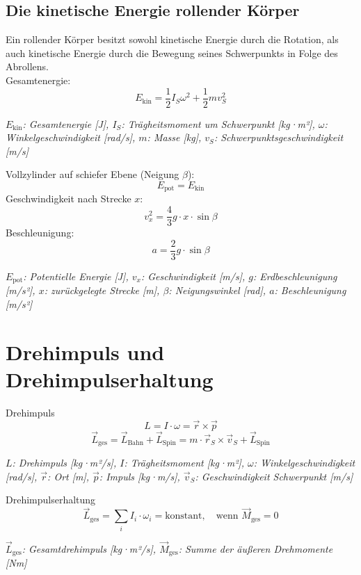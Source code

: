\documentclass[a4paper,10pt]{article}
\newenvironment{displayformula}
{
	\begin{framed}
		\color{formulaColor}
	}
	{\end{framed}}
\newcommand{\formulalegend}[1]{%
	\par\vspace{0.5ex}%
	{{\color{legendColor}\RaggedRight\small\textit{#1}}}%
	\par\vspace{1.5ex}%
}
\begin{document}
\subsection{Die kinetische Energie rollender Körper}

\begin{displayformula}
	Ein rollender Körper besitzt sowohl kinetische Energie durch die Rotation, als auch kinetische Energie durch die Bewegung seines Schwerpunkts in Folge des Abrollens. \\ 
	Gesamtenergie:
	\[
	E_{\text{kin}} = \frac{1}{2} I_S \omega^2 + \frac{1}{2} m v_S^2
	\]
\end{displayformula}
\formulalegend{
	\( E_{\text{kin}} \): Gesamtenergie [J], \( I_S \): Trägheitsmoment um Schwerpunkt [kg·m²], \( \omega \): Winkelgeschwindigkeit [rad/s], \( m \): Masse [kg], \( v_S \): Schwerpunktsgeschwindigkeit [m/s]
}

\begin{displayformula}
	Vollzylinder auf schiefer Ebene (Neigung \( \beta \)):
	\[
	E_{\text{pot}} = E_{\text{kin}}
	\]
	Geschwindigkeit nach Strecke \( x \):
	\[
	v_x^2 = \frac{4}{3} g \cdot x \cdot \sin\beta
	\]
	Beschleunigung:
	\[
	a = \frac{2}{3} g \cdot \sin\beta
	\]
\end{displayformula}
\formulalegend{
	\( E_{\text{pot}} \): Potentielle Energie [J], \( v_x \): Geschwindigkeit [m/s], \( g \): Erdbeschleunigung [m/s²], \( x \): zurückgelegte Strecke [m], \( \beta \): Neigungswinkel [rad], \( a \): Beschleunigung [m/s²]
}

\section{Drehimpuls und Drehimpulserhaltung}

\begin{displayformula}
	Drehimpuls
	\[
	L = I \cdot \omega = \vec{r} \times \vec{p}
	\]
	\[
	\vec{L}_{\text{ges}} = \vec{L}_{\text{Bahn}} + \vec{L}_{\text{Spin}} = m \cdot \vec{r}_S \times \vec{v}_S + \vec{L}_{\text{Spin}}
	\]
\end{displayformula}
\formulalegend{
	\( L \): Drehimpuls [kg·m²/s], \( I \): Trägheitsmoment [kg·m²], \( \omega \): Winkelgeschwindigkeit [rad/s], \( \vec{r} \): Ort [m], \( \vec{p} \): Impuls [kg·m/s], \( \vec{v}_S \): Geschwindigkeit Schwerpunkt [m/s]
}

\begin{displayformula}
	Drehimpulserhaltung
	\[
	\vec{L}_{\text{ges}} = \sum_i I_i \cdot \omega_i = \text{konstant}, \quad \text{wenn } \vec{M}_{\text{ges}} = 0
	\]
\end{displayformula}
\formulalegend{
	\( \vec{L}_{\text{ges}} \): Gesamtdrehimpuls [kg·m²/s], \( \vec{M}_{\text{ges}} \): Summe der äußeren Drehmomente [Nm]
}
\end{document}
